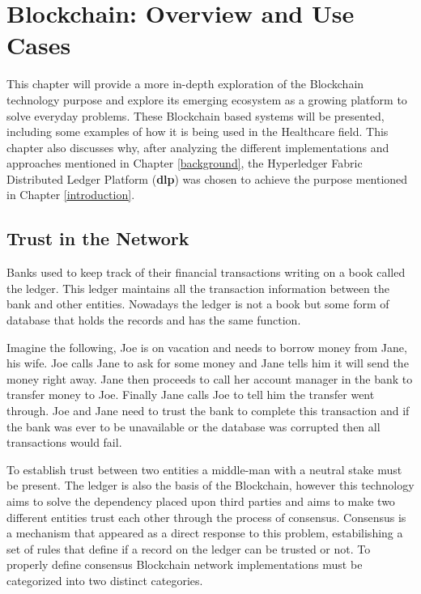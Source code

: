 \chapter{Blockchain: Overview and Use Cases}

This chapter will provide a more in-depth exploration of the Blockchain
technology purpose and explore its emerging ecosystem as a growing platform to
solve everyday problems. These Blockchain based systems will be presented,
including some examples of how it is being used in the Healthcare field. This
chapter also discusses why, after analyzing the different implementations and
approaches mentioned in Chapter \ref{background}, the Hyperledger Fabric
Distributed Ledger Platform (\textbf{dlp}) was chosen to achieve the purpose
mentioned in Chapter \ref{introduction}.

\section{Trust in the Network}

Banks used to keep track of their financial transactions writing on a book
called the ledger. This ledger maintains all the transaction information
between the bank and other entities. Nowadays the ledger is not a book but some
form of database that holds the records and has the same function. 

Imagine the following, Joe is on vacation and needs to borrow money from Jane,
his wife. Joe calls Jane to ask for some money and Jane tells him it will send
the money right away. Jane then proceeds to call her account manager in the
bank to transfer money to Joe. Finally Jane calls Joe to tell him the transfer
went through. Joe and Jane need to trust the bank to complete this transaction
and if the bank was ever to be unavailable or the database was corrupted then
all transactions would fail. 

To establish trust between two entities a middle-man with a neutral stake must
be present. The ledger is also the basis of the Blockchain, however this
technology aims to solve the dependency placed upon third parties and aims to
make two different entities trust each other through the process of consensus.
Consensus is a mechanism that appeared as a direct response to this problem,
estabilishing a set of rules that define if a record on the ledger can be
trusted or not. To properly define consensus Blockchain network implementations
must be categorized into two distinct categories.

